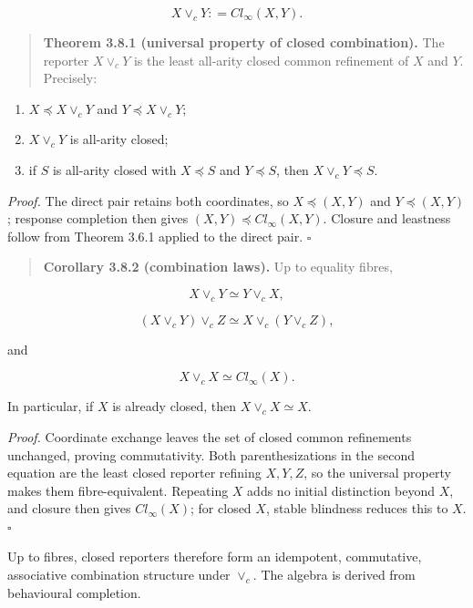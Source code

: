 \documentclass[11pt,a4paper]{article}
\begin{document}
\[\boxed{X \vee_{c}Y{: =}{Cl}_{\infty}(X,Y).}\]

\begin{quote}
\textbf{Theorem 3.8.1 (universal property of closed combination).} The
reporter \(X \vee_{c}Y\) is the least all-arity closed common refinement
of \(X\) and \(Y\). Precisely:
\end{quote}

\begin{enumerate}
\def\labelenumi{\arabic{enumi}.}
\tightlist
\item
  \(X \preccurlyeq X \vee_{c}Y\) and \(Y \preccurlyeq X \vee_{c}Y\);
\item
  \(X \vee_{c}Y\) is all-arity closed;
\item
  if \(S\) is all-arity closed with \(X \preccurlyeq S\) and
  \(Y \preccurlyeq S\), then \(X \vee_{c}Y \preccurlyeq S\).
\end{enumerate}

\emph{Proof.} The direct pair retains both coordinates, so
\(X \preccurlyeq (X,Y)\) and \(Y \preccurlyeq (X,Y)\); response
completion then gives \((X,Y) \preccurlyeq {Cl}_{\infty}(X,Y)\). Closure
and leastness follow from Theorem 3.6.1 applied to the direct pair.
\(\ensuremath{\square}\)

\begin{quote}
\textbf{Corollary 3.8.2 (combination laws).} Up to equality fibres,
\end{quote}

\[X \vee_{c}Y \simeq Y \vee_{c}X,\]

\[\left( X \vee_{c}Y \right) \vee_{c}Z \simeq X \vee_{c}\left( Y \vee_{c}Z \right),\]

and

\[X \vee_{c}X \simeq {Cl}_{\infty}(X).\]

In particular, if \(X\) is already closed, then
\(X \vee_{c}X \simeq X\).

\emph{Proof.} Coordinate exchange leaves the set of closed common
refinements unchanged, proving commutativity. Both parenthesizations in
the second equation are the least closed reporter refining \(X,Y,Z\), so
the universal property makes them fibre-equivalent. Repeating \(X\) adds
no initial distinction beyond \(X\), and closure then gives
\({Cl}_{\infty}(X)\); for closed \(X\), stable blindness reduces this to
\(X\). \(\ensuremath{\square}\)

Up to fibres, closed reporters therefore form an idempotent,
commutative, associative combination structure under \(\vee_{c}\). The
algebra is derived from behavioural completion.
\end{document}
